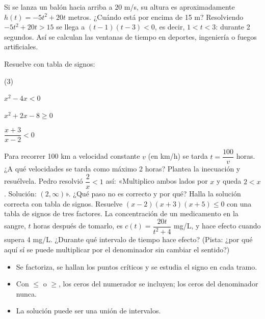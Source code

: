 \documentclass[11pt]{article}
\begin{document}
\begin{aplicacion}
Si se lanza un balón hacia arriba a $20$ m/s, su altura es aproximadamente
$h(t) = -5t^2 + 20t$ metros. ¿Cuándo está por encima de 15 m? Resolviendo
$-5t^2 + 20t > 15$ se llega a $(t - 1)(t - 3) < 0$, es decir, $1 < t < 3$:
durante 2 segundos. Así se calculan las ventanas de tiempo en deportes,
ingeniería o fuegos artificiales.
\end{aplicacion}

\begin{preguntas}
\pregunta Resuelve con tabla de signos:
\begin{opciones*}(3)
  \item $x^2 - 4x < 0$
  \item $x^2 + 2x - 8 \ge 0$
  \item $\dfrac{x + 3}{x - 2} < 0$
\end{opciones*}
\espacio{4.5cm}
\pregunta Para recorrer 100 km a velocidad constante $v$ (en km/h) se tarda
$t = \dfrac{100}{v}$ horas. ¿A qué velocidades se tarda como máximo 2 horas?
Plantea la inecuación y resuélvela.
\espacio{3cm}
\pregunta Pedro resolvió $\dfrac{2}{x} < 1$ así: «Multiplico ambos lados por $x$ y
queda $2 < x$. Solución: $(2, \infty)$». ¿Qué paso no es correcto y por qué? Halla
la solución correcta con tabla de signos.
\espacio{3.5cm}
\pregunta Resuelve $(x - 2)(x + 3)(x + 5) \le 0$ con una tabla de signos de tres factores.
\espacio{3cm}
\pregunta La concentración de un medicamento en la sangre, $t$ horas después de
tomarlo, es $c(t) = \dfrac{20t}{t^2 + 4}$ mg/L, y hace efecto cuando supera 4 mg/L.
¿Durante qué intervalo de tiempo hace efecto? (Pista: ¿por qué aquí sí se puede
multiplicar por el denominador sin cambiar el sentido?)
\espacio{3.5cm}
\end{preguntas}

\begin{resumen}
\begin{itemize}
  \item Se factoriza, se hallan los puntos críticos y se estudia el signo en cada tramo.
  \item Con $\le$ o $\ge$, los ceros del numerador se incluyen; los ceros del
        denominador nunca.
  \item La solución puede ser una unión de intervalos.
\end{itemize}
\end{resumen}

\label{tema:valorabsoluto}
\end{document}
